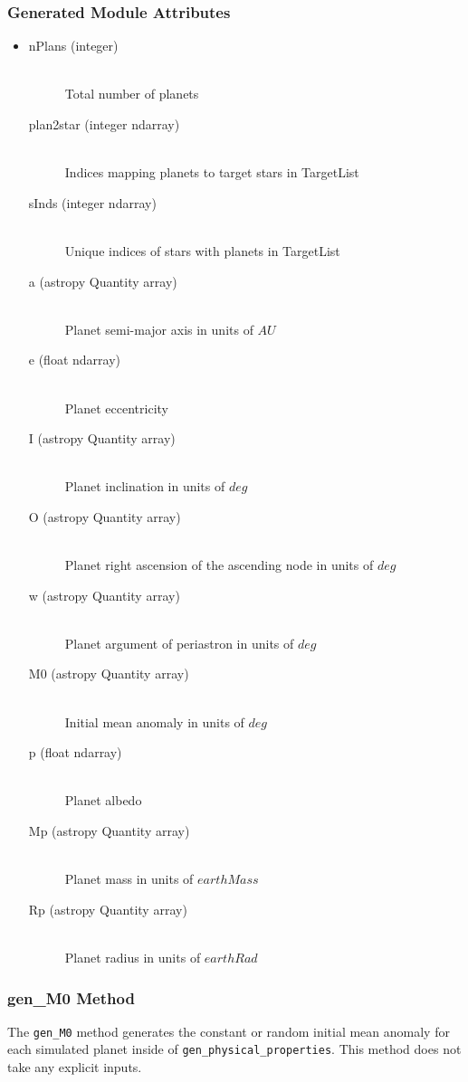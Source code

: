 \documentclass[cleanfoot]{asme2ej}
\begin{document}
\subsubsection*{Generated Module Attributes}
\begin{itemize}
\item 
\begin{description}
    \item[nPlans (integer)] \hfill \\ Total number of planets
    \item[plan2star (integer ndarray)] \hfill \\ Indices mapping planets to target stars in TargetList
    \item[sInds (integer ndarray)] \hfill \\ Unique indices of stars with planets in TargetList
    \item[a (astropy Quantity array)] \hfill \\ Planet semi-major axis in units of $ AU $
    \item[e (float ndarray)] \hfill \\ Planet eccentricity
    \item[I (astropy Quantity array)] \hfill \\ Planet inclination in units of $ deg $
    \item[O (astropy Quantity array)] \hfill \\ Planet right ascension of the ascending node in units of $ deg $
    \item[w (astropy Quantity array)] \hfill \\ Planet argument of periastron in units of $ deg $
    \item[M0 (astropy Quantity array)] \hfill \\ Initial mean anomaly in units of $ deg $
    \item[p (float ndarray)] \hfill \\ Planet albedo
    \item[Mp (astropy Quantity array)] \hfill \\ Planet mass in units of $earthMass$
    \item[Rp (astropy Quantity array)] \hfill \\ Planet radius in units of $earthRad$
\end{description}
\end{itemize}

\subsubsection{gen\_M0 Method} \label{sec:genM0task}
The \verb+gen_M0+ method generates the constant or random initial mean anomaly for each simulated planet inside of \verb+gen_physical_properties+. This method does not take any explicit inputs.
\end{document}
